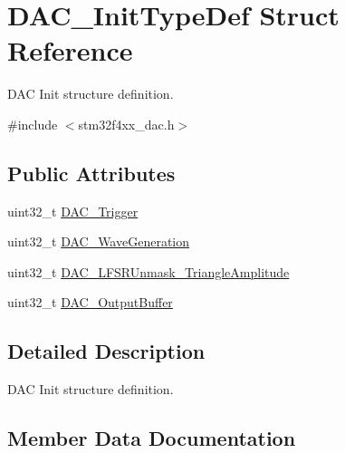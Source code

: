 \hypertarget{struct_d_a_c___init_type_def}{}\section{D\+A\+C\+\_\+\+Init\+Type\+Def Struct Reference}
\label{struct_d_a_c___init_type_def}


D\+A\+C Init structure definition.  




{\ttfamily \#include $<$stm32f4xx\+\_\+dac.\+h$>$}

\subsection*{Public Attributes}
\begin{DoxyCompactItemize}
\item 
uint32\+\_\+t \hyperlink{struct_d_a_c___init_type_def_a7b26ebaeb51a0157a781f7de8ba779e5}{D\+A\+C\+\_\+\+Trigger}
\item 
uint32\+\_\+t \hyperlink{struct_d_a_c___init_type_def_a6753e78ddd2dc8273444ba01a272d63a}{D\+A\+C\+\_\+\+Wave\+Generation}
\item 
uint32\+\_\+t \hyperlink{struct_d_a_c___init_type_def_a27ed27a544d50781b20d59cc55e6cef8}{D\+A\+C\+\_\+\+L\+F\+S\+R\+Unmask\+\_\+\+Triangle\+Amplitude}
\item 
uint32\+\_\+t \hyperlink{struct_d_a_c___init_type_def_ad3e9e01486443e99f19e65a446b03ca6}{D\+A\+C\+\_\+\+Output\+Buffer}
\end{DoxyCompactItemize}


\subsection{Detailed Description}
D\+A\+C Init structure definition. 

\subsection{Member Data Documentation}
\hypertarget{struct_d_a_c___init_type_def_a27ed27a544d50781b20d59cc55e6cef8}{}
